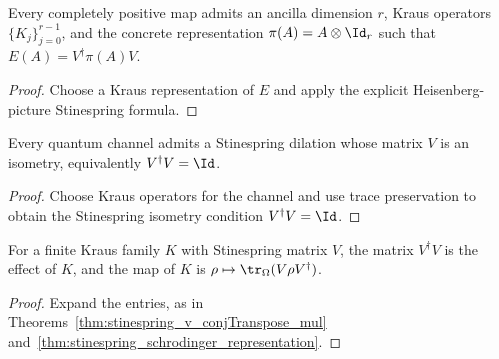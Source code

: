 \begin{theorem}
    \label{thm:exists_stinespring_dilation}
    \leanok
    Every completely positive map admits an ancilla dimension $r$, Kraus operators
    $\{K_j\}_{j=0}^{r-1}$, and the concrete representation
    $\pi(A)=A\otimes\Id_r$ such that $E(A)=V^\dagger\pi(A)V$.
\end{theorem}

\begin{proof}\leanok
    Choose a Kraus representation of $E$ and apply the explicit Heisenberg-picture
    Stinespring formula.
\end{proof}

\begin{theorem}
    \label{thm:exists_stinespring_isometry_of_cptp}
    \leanok
    Every quantum channel admits a Stinespring dilation whose matrix $V$ is an
    isometry, equivalently $V^\dagger V=\Id$.
\end{theorem}

\begin{proof}\leanok
    Choose Kraus operators for the channel and use trace preservation to obtain
    the Stinespring isometry condition $V^\dagger V=\Id$.
\end{proof}

\begin{lemma}
    \label{lem:kraus_family_stinespring}
    \leanok
    For a finite Kraus family $K$ with Stinespring matrix $V$, the matrix $V^\dagger V$ is
    the effect of $K$, and the map of $K$ is $\rho\mapsto\tr_\Omega(V\rho V^\dagger)$.
\end{lemma}
\begin{proof}\leanok
    Expand the entries, as in Theorems~\ref{thm:stinespring_v_conjTranspose_mul}
    and~\ref{thm:stinespring_schrodinger_representation}.
\end{proof}

